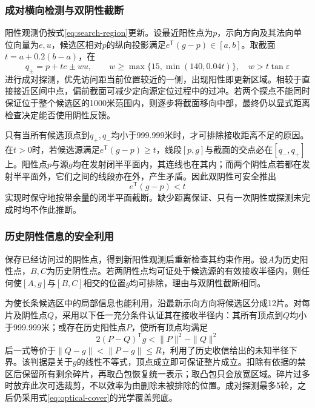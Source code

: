 \documentclass{JXUSTmodeling}
\begin{document}
\subsubsection{成对横向检测与双阴性截断}
阳性观测仍按式\eqref{eq:search-region}更新。设最近阳性点为$p$，示向方向及其法向单位向量为$e,u$，候选区相对$p$的纵向投影满足$e^{\mathsf T}(g-p)\in[a,b]$。取截面$t=a+0.2(b-a)$，在
\begin{equation}
 q_\pm=p+te\pm wu,\qquad
 w\ge\max\{15,\min(140,0.04t)\},\quad w>t\tan\varepsilon
 \label{eq:paired-probe}
\end{equation}
进行成对探测，优先访问距当前位置较近的一侧，出现阳性即更新区域。相较于直接接近区间中点，偏前截面可减少定向源定位过程中的过冲。若两个探点不能同时保证位于整个候选区的1000米范围内，则逐步将截面移向中部，最终仍以显式距离检查决定能否使用阴性反馈。

只有当所有候选顶点到$q_+,q_-$均小于999.999米时，才可排除接收距离不足的原因。在$t>0$时，若候选源满足$e^{\mathsf T}(g-p)\ge t$，线段$[p,g]$与截面的交点必在$[q_-,q_+]$上。阳性点$p$与源$g$均在发射闭半平面内，其连线也在其内；而两个阴性点若都在发射半平面外，它们之间的线段亦在外，产生矛盾。因此双阴性可安全推出
\begin{equation}
 e^{\mathsf T}(g-p)<t
 \label{eq:paired-negative}
\end{equation}
实现时保守地按带余量的闭半平面截断。缺少距离保证、只有一次阴性或探测未完成时均不作此推断。

\subsubsection{历史阴性信息的安全利用}
保存已经访问过的阴性点，得到新阳性观测后重新检查其约束作用。设$A$为历史阳性点，$B,C$为历史阴性点。若两阴性点均可证处于候选源的有效接收半径内，则任何使$[A,g]$与$[B,C]$相交的位置$g$均可排除，理由与双阴性截断相同。

为使长条候选区中的局部信息也能利用，沿最新示向方向将候选区分成12片。对每片及阴性点$Q$，采用以下任一充分条件认证其在接收半径内：其所有顶点到$Q$均小于999.999米；或存在历史阳性点$P$，使所有顶点均满足
\begin{equation}
 2(P-Q)^{\mathsf T}g<\|P\|^2-\|Q\|^2
 \label{eq:relative-reception}
\end{equation}
后一式等价于$\|Q-g\|<\|P-g\|\le R$，利用了历史收信给出的未知半径下界。该判据是关于$g$的线性不等式，顶点成立即可保证整片成立。扣除有依据的禁区后保留所有剩余碎片，再取凸包恢复统一表示；取凸包只会放宽区域。碎片过多时放弃此次可选裁剪，不以效率为由删除未被排除的位置。成对探测最多5轮，之后仍采用式\eqref{eq:optical-cover}的光学覆盖兜底。
\end{document}
